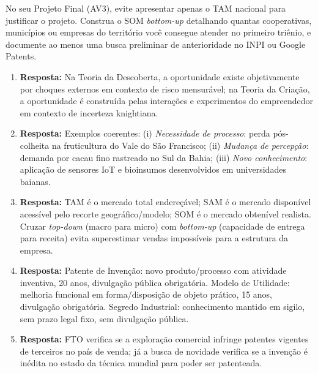 \begin{boxDica}
  No seu Projeto Final (AV3), evite apresentar apenas o TAM nacional para justificar o projeto. Construa o SOM \textit{bottom-up} detalhando quantas cooperativas, municípios ou empresas do território você consegue atender no primeiro triênio, e documente ao menos uma busca preliminar de anterioridade no INPI ou Google Patents.
\end{boxDica}

\clearpage
{}

\begin{boxGabarito}
  \begin{enumerate}[leftmargin=1.5em, itemsep=4pt]
    \item \textbf{Resposta:} Na Teoria da Descoberta, a oportunidade existe objetivamente por choques externos em contexto de risco mensurável; na Teoria da Criação, a oportunidade é construída pelas interações e experimentos do empreendedor em contexto de incerteza knightiana.
    \item \textbf{Resposta:} Exemplos coerentes: (i) \textit{Necessidade de processo}: perda pós-colheita na fruticultura do Vale do São Francisco; (ii) \textit{Mudança de percepção}: demanda por cacau fino rastreado no Sul da Bahia; (iii) \textit{Novo conhecimento}: aplicação de sensores IoT e bioinsumos desenvolvidos em universidades baianas.
    \item \textbf{Resposta:} TAM é o mercado total endereçável; SAM é o mercado disponível acessível pelo recorte geográfico/modelo; SOM é o mercado obtenível realista. Cruzar \textit{top-down} (macro para micro) com \textit{bottom-up} (capacidade de entrega para receita) evita superestimar vendas impossíveis para a estrutura da empresa.
    \item \textbf{Resposta:} Patente de Invenção: novo produto/processo com atividade inventiva, 20 anos, divulgação pública obrigatória. Modelo de Utilidade: melhoria funcional em forma/disposição de objeto prático, 15 anos, divulgação obrigatória. Segredo Industrial: conhecimento mantido em sigilo, sem prazo legal fixo, sem divulgação pública.
    \item \textbf{Resposta:} FTO verifica se a exploração comercial infringe patentes vigentes de terceiros no país de venda; já a busca de novidade verifica se a invenção é inédita no estado da técnica mundial para poder ser patenteada.

\end{enumerate}
\end{boxGabarito}
